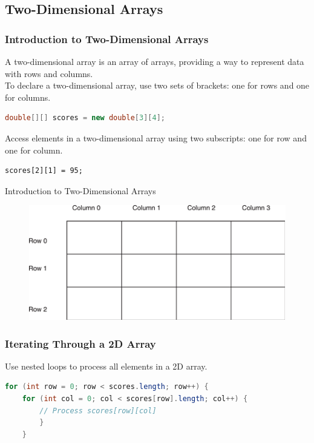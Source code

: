\documentclass[11pt]{beamer}
\begin{document}
\subsection{Two-Dimensional Arrays}
\begin{frame}[fragile]
\frametitle{Introduction to Two-Dimensional Arrays}
    A two-dimensional array is an array of arrays, providing a way to represent data with rows and columns. \\ \vspace{1em}
    To declare a two-dimensional array, use two sets of brackets: one for rows and one for columns.
    \begin{lstlisting}[language=Java]
double[][] scores = new double[3][4];
    \end{lstlisting}
    Access elements in a two-dimensional array using two subscripts: one for row and one for column.
    \begin{lstlisting}
scores[2][1] = 95;
    \end{lstlisting}
\end{frame}

\begin{frame}{Introduction to Two-Dimensional Arrays}
    \noindent 
    \begin{figure}[H]
    \centering
    \includegraphics[scale=0.6]{Images/chapter07_section09_fig18.png}
    \end{figure}   
\end{frame}

\begin{frame}[fragile]
\frametitle{Iterating Through a 2D Array}
Use nested loops to process all elements in a 2D array.
\begin{lstlisting}[language=Java]
for (int row = 0; row < scores.length; row++) {
    for (int col = 0; col < scores[row].length; col++) {
        // Process scores[row][col]
        }
    }
\end{lstlisting}
\end{frame}
\end{document}
